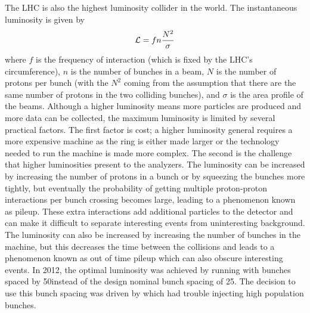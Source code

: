 The LHC is also the highest luminosity collider in the world. The instantaneous
luminosity is given by 
\begin{equation}
    \mathcal{L}=fn\frac{N^{2}}{\sigma}
\end{equation} where $f$ is the frequency of interaction (which is fixed by the
LHC's circumference), $n$ is the number of bunches in a beam, $N$ is the
number of protons per bunch (with the $N^{2}$ coming from the assumption that
there are the same number of protons in the two colliding bunches), and
$\sigma$ is the area profile of the beams. Although a higher luminosity means
more particles are produced and more data can be collected, the maximum
luminosity is limited by several practical factors. The first factor is cost; a
higher luminosity general requires a more expensive machine as the ring is
either made larger or the technology needed to run the machine is made more
complex. The second is the challenge that higher luminosities present to the
analyzers. The luminosity can be increased by increasing the number of protons
in a bunch or by squeezing the bunches more tightly, but eventually the
probability of getting multiple proton-proton interactions per bunch crossing
becomes large, leading to a phenomenon known as pileup. These extra interactions
add additional particles to the detector and can make it difficult to separate
interesting events from uninteresting background. The luminosity can also be
increased by increasing the number of bunches in the machine, but this
decreases the time between the collisions and leads to a phenomenon known as
out of time pileup which can also obscure interesting events. In 2012, the
optimal luminosity was achieved by running with bunches spaced by 50\ns instead
of the design nominal bunch spacing of 25\ns. The decision to use this bunch
spacing was driven by \linactwo which had trouble injecting high population
bunches.
